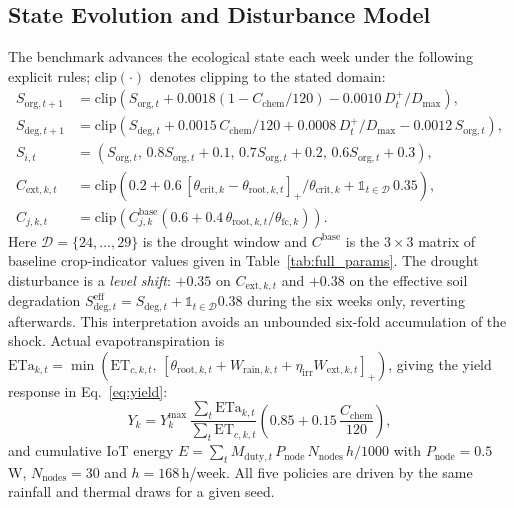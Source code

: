\documentclass[11pt,a4paper]{article}
\newcommand{\pos}[1]{\left[#1\right]_{+}}
\newcommand{\clip}[1]{\mathrm{clip}\!\left(#1\right)}
\begin{document}
\subsection{State Evolution and Disturbance Model}
The benchmark advances the ecological state each week under the following explicit rules; $\clip{\cdot}$ denotes clipping to the stated domain:
\begin{align}
  S_{\mathrm{org},t+1} &= \clip{S_{\mathrm{org},t} + 0.0018\left(1-C_{\mathrm{chem}}/120\right) - 0.0010\,D_t^+/D_{\max}},\\
  S_{\mathrm{deg},t+1} &= \clip{S_{\mathrm{deg},t} + 0.0015\,C_{\mathrm{chem}}/120 + 0.0008\,D_t^+/D_{\max} - 0.0012\,S_{\mathrm{org},t}},\\
  S_{i,t} &= \left(S_{\mathrm{org},t},\,0.8S_{\mathrm{org},t}+0.1,\,0.7S_{\mathrm{org},t}+0.2,\,0.6S_{\mathrm{org},t}+0.3\right),\\
  C_{\mathrm{ext},k,t} &= \clip{0.2+0.6\,\pos{\theta_{\mathrm{crit},k}-\theta_{\mathrm{root},k,t}}/\theta_{\mathrm{crit},k} + \mathbb{1}_{t\in\mathcal{D}}\,0.35},\\
  C_{j,k,t} &= \clip{C^{\mathrm{base}}_{j,k}\left(0.6+0.4\,\theta_{\mathrm{root},k,t}/\theta_{\mathrm{fc},k}\right)}.
\end{align}
Here $\mathcal{D}=\{24,\dots,29\}$ is the drought window and $C^{\mathrm{base}}$ is the $3\times3$ matrix of baseline crop-indicator values given in Table~\ref{tab:full_params}. The drought disturbance is a \emph{level shift}: $+0.35$ on $C_{\mathrm{ext},k,t}$ and $+0.38$ on the effective soil degradation $S_{\mathrm{deg},t}^{\mathrm{eff}}=S_{\mathrm{deg},t}+\mathbb{1}_{t\in\mathcal{D}}0.38$ during the six weeks only, reverting afterwards. This interpretation avoids an unbounded six-fold accumulation of the shock. Actual evapotranspiration is $\mathrm{ETa}_{k,t}=\min\!\left(\mathrm{ET}_{c,k,t},\,\pos{\theta_{\mathrm{root},k,t}+W_{\mathrm{rain},k,t}+\eta_{\mathrm{irr}}W_{\mathrm{ext},k,t}}\right)$, giving the yield response in Eq.~\eqref{eq:yield}:
\begin{equation}
  Y_k = Y_k^{\max}\,\frac{\sum_t \mathrm{ETa}_{k,t}}{\sum_t \mathrm{ET}_{c,k,t}}\left(0.85+0.15\,\frac{C_{\mathrm{chem}}}{120}\right),
  \label{eq:yield}
\end{equation}
and cumulative IoT energy $E=\sum_t M_{\mathrm{duty},t}\,P_{\mathrm{node}}\,N_{\mathrm{nodes}}\,h/1000$ with $P_{\mathrm{node}}=0.5$\,W, $N_{\mathrm{nodes}}=30$ and $h=168$\,h/week. All five policies are driven by the same rainfall and thermal draws for a given seed.
\end{document}
